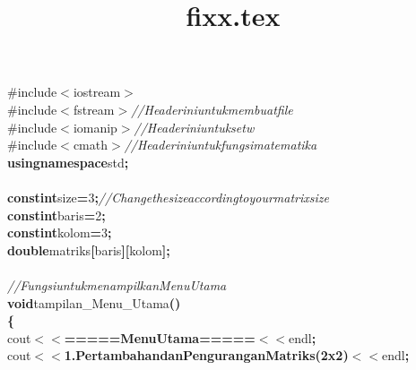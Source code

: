 \documentclass[a4paper, 10pt]{article}
\title{fixx.tex}
\newcommand\SPC{\hspace*{0.6em}}
\newcommand\QOT{\mbox{\char 34}}
\newcommand{\CppAComment}[1]{\textit{\textcolor[rgb]{0,0.47,0.84}{#1}}}
\newcommand{\CppAIdentifier}[1]{#1}
\newcommand{\CppANumber}[1]{\textcolor[rgb]{0.5,0,0.5}{#1}}
\newcommand{\CppAPreprocessor}[1]{\textcolor[rgb]{0,0.5,0}{#1}}
\newcommand{\CppAReservedWord}[1]{\textbf{#1}}
\newcommand{\CppASpace}[1]{\colorbox[rgb]{1,1,1}{#1}}
\newcommand{\CppAString}[1]{\textbf{\textcolor[rgb]{0,0,1}{#1}}}
\newcommand{\CppASymbol}[1]{\textbf{\textcolor[rgb]{1,0,0}{#1}}}
\begin{document}
\begin{ttfamily}
\noindent
\CppAPreprocessor{\#include\SPC $<$iostream$>$}\\
\CppAPreprocessor{\#include\SPC $<$fstream$>$\SPC }\CppAComment{//\SPC Header\SPC ini\SPC untuk\SPC membuat\SPC file}\\
\CppAPreprocessor{\#include\SPC $<$iomanip$>$\SPC }\CppAComment{//\SPC Header\SPC ini\SPC untuk\SPC setw}\\
\CppAPreprocessor{\#include\SPC $<$cmath$>$\SPC }\CppAComment{//\SPC Header\SPC ini\SPC untuk\SPC fungsi\SPC matematika}\\
\CppAReservedWord{using}\CppASpace{\SPC }\CppAReservedWord{namespace}\CppASpace{\SPC }\CppAIdentifier{std}\CppASymbol{;}\\
\\
\CppAReservedWord{const}\CppASpace{\SPC }\CppAReservedWord{int}\CppASpace{\SPC }\CppAIdentifier{size}\CppASpace{\SPC }\CppASymbol{=}\CppASpace{\SPC }\CppANumber{3}\CppASymbol{;}\CppASpace{\SPC }\CppAComment{//\SPC Change\SPC the\SPC size\SPC according\SPC to\SPC your\SPC matrix\SPC size}\\
\CppAReservedWord{const}\CppASpace{\SPC }\CppAReservedWord{int}\CppASpace{\SPC }\CppAIdentifier{baris}\CppASpace{\SPC }\CppASymbol{=}\CppASpace{\SPC }\CppANumber{2}\CppASymbol{;}\\
\CppAReservedWord{const}\CppASpace{\SPC }\CppAReservedWord{int}\CppASpace{\SPC }\CppAIdentifier{kolom}\CppASpace{\SPC }\CppASymbol{=}\CppASpace{\SPC }\CppANumber{3}\CppASymbol{;}\\
\CppAReservedWord{double}\CppASpace{\SPC }\CppAIdentifier{matriks}\CppASymbol{[}\CppAIdentifier{baris}\CppASymbol{]}\CppASymbol{[}\CppAIdentifier{kolom}\CppASymbol{]}\CppASymbol{;}\\
\\
\CppAComment{//\SPC Fungsi\SPC untuk\SPC menampilkan\SPC Menu\SPC Utama}\\
\CppAReservedWord{void}\CppASpace{\SPC }\CppAIdentifier{tampilan\_Menu\_Utama}\CppASymbol{(}\CppASymbol{)}\CppASpace{\SPC }\\
\CppASymbol{\{}\\
\CppASpace{\SPC \SPC \SPC \SPC }\CppAIdentifier{cout}\CppASpace{\SPC }\CppASymbol{$<$$<$}\CppASpace{\SPC }\CppAString{\QOT =====\SPC Menu\SPC Utama\SPC =====\QOT }\CppASpace{\SPC }\CppASymbol{$<$$<$}\CppASpace{\SPC }\CppAIdentifier{endl}\CppASymbol{;}\\
\CppASpace{\SPC \SPC \SPC \SPC }\CppAIdentifier{cout}\CppASpace{\SPC }\CppASymbol{$<$$<$}\CppASpace{\SPC }\CppAString{\QOT 1.\SPC Pertambahan\SPC dan\SPC Pengurangan\SPC Matriks\SPC (2x2)\QOT }\CppASpace{\SPC }\CppASymbol{$<$$<$}\CppASpace{\SPC }\CppAIdentifier{endl}\CppASymbol{;}\\

\end{ttfamily}
\end{document}
